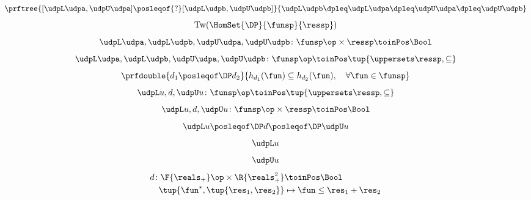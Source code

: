 {\begin{forslides}
		\begin{equation*}
			\label{eq:order_udp_1}
			\prftree{[\udpL\udpa,\udpU\udpa] \posleqof{?} [\udpL\udpb,\udpU\udpb]}{\udpL\udpb\dpleq\udpL\udpa\dpleq\udpU\udpa\dpleq\udpU\udpb}
		\end{equation*}
		\begin{equation*}
			\label{eq:order_udp_2}
			\text{Tw}(\HomSet{\DP}{\funsp}{\ressp})
		\end{equation*}
		\begin{equation*}
			\label{eq:order_udp_3}
			\udpL\udpa,\udpL\udpb,\udpU\udpa,\udpU\udpb\colon \funsp\op \times \ressp \toinPos \Bool
		\end{equation*}
		\begin{equation*}
			\label{eq:order_udp_4}
			\udpL\udpa,\udpL\udpb,\udpU\udpa,\udpU\udpb\colon \funsp\op \toinPos  \tup{\uppersets \ressp, \subseteq}
		\end{equation*}
		\begin{equation*}
			\label{eq:upos_dp_def_4}
			\prfdouble{d_1\posleqof\DP d_2}{h_{d_1}(\fun)\subseteq h_{d_2}(\fun), \quad \forall \fun \in \funsp}
		\end{equation*}
		\begin{equation*}
			\label{eq:order_udp_5}
			\udpL u,d,\udpU u\colon \funsp\op \toinPos  \tup{\uppersets \ressp, \subseteq}
		\end{equation*}
		\begin{equation*}
			\label{eq:order_udp_6}
			\udpL u,d,\udpU u\colon  \funsp\op \times \ressp \toinPos \Bool
		\end{equation*}
		\begin{equation*}
			\label{eq:order_udp_7}
			\udpL u \posleqof\DP d \posleqof\DP \udpU u
		\end{equation*}
		\begin{equation*}
			\label{eq:order_udp_8}
			\udpL u
		\end{equation*}
		\begin{equation*}
			\label{eq:order_udp_9}
			\udpU u
		\end{equation*}
		\begin{equation*}
			\label{eq:order_udp_10}
			\begin{aligned}
				d\colon \F{\reals_+}\op \times \R{\reals_+^2} & \toinPos \Bool                  \\
				\tup{\fun^*,\tup{\res_1,\res_2}}              & \mapsto \fun \leq \res_1+\res_2
			\end{aligned}
		\end{equation*}

\end{forslides}}
